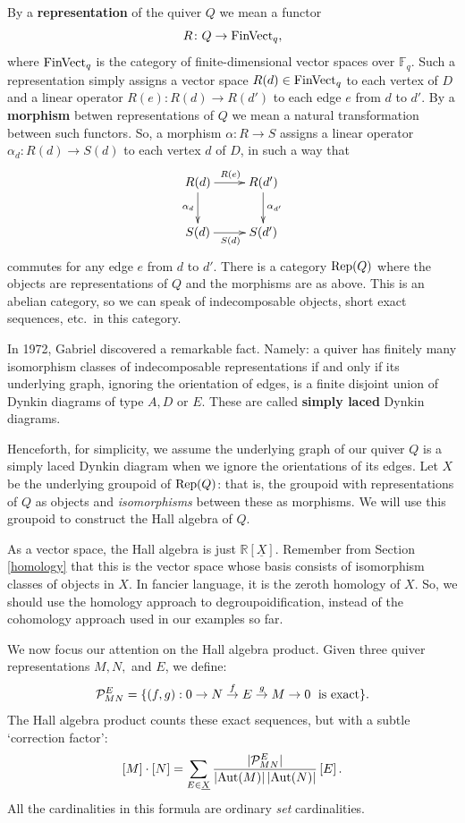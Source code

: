 \documentclass{article}
\newcommand{\Rep}{{\rm Rep}}
\newcommand{\FinVect}{{\rm FinVect}}
\renewcommand{\to}{\rightarrow}
\newcommand{\maps}{\colon}
\newcommand{\R}{{\mathbb R}}
\newcommand{\F}{{\mathbb F}}
\newcommand{\Aut}{{\rm Aut}}
\renewcommand{\u}[1]{\underline{#1}}
\begin{document}
By a \textbf{representation} of the quiver $Q$ we mean a functor 
\[   R \maps Q \to \FinVect_q, \]
where $\FinVect_q$ is the category of finite-dimensional vector spaces
over $\F_q$.  Such a representation simply assigns a vector space
$R(d) \in \FinVect_q$ to each vertex of $D$ and a linear operator
$R(e) \maps R(d) \to R(d')$ to each edge $e$ from $d$ to $d'$.  By a
\textbf{morphism} betwen representations of $Q$ we mean a natural
transformation between such functors.  So, a morphism $\alpha \maps R
\to S$ assigns a linear operator $\alpha_d \maps R(d) \to S(d)$ to
each vertex $d$ of $D$, in such a way that
\[
\xymatrix{
R(d) \ar[d]_{\alpha_d} \ar[r]^{R(e)} & R(d') \ar[d]^{\alpha_{d'}} \\
S(d) \ar[r]_{S(d)} & S(d')
}
\]
commutes for any edge $e$ from $d$ to $d'$.  There is a category
$\Rep(Q)$ where the objects are representations of $Q$ and the
morphisms are as above.  This is an abelian category, so we can speak
of indecomposable objects, short exact sequences, etc.\ in this
category.

In 1972, Gabriel \cite{Gabriel} discovered a remarkable fact.  Namely:
a quiver has finitely many isomorphism classes of indecomposable
representations if and only if its underlying graph, ignoring the
orientation of edges, is a finite disjoint union of Dynkin diagrams of
type $A, D$ or $E$.  These are called {\bf simply laced} Dynkin
diagrams.

Henceforth, for simplicity, we assume the underlying graph of our
quiver $Q$ is a simply laced Dynkin diagram when we ignore the
orientations of its edges.  Let $X$ be the underlying groupoid of
$\Rep(Q)$: that is, the groupoid with representations of $Q$ as
objects and \textit{isomorphisms} between these as morphisms.  We will
use this groupoid to construct the Hall algebra of $Q$.

As a vector space, the Hall algebra is just $\R[\u{X}]$.
Remember from Section \ref{homology} that this is the vector space
whose basis consists of isomorphism classes of objects in $X$.  In
fancier language, it is the zeroth homology of $X$.  So, we should use
the homology approach to degroupoidification, instead of the
cohomology approach used in our examples so far.

We now focus our attention on the Hall algebra product.  Given three quiver
representations $M,N,$ and $E$, we define:
\[\mathcal{P}_{MN}^E=
\{(f,g): 
0\to N \stackrel{f}{\rightarrow} E \stackrel{g}{\rightarrow} M \to 0 
\textrm{\; is exact} \}. \]
The Hall algebra product counts these exact sequences, but with a
subtle `correction factor':
\[[M] \cdot [N] =\sum_{E \in \u{X}} 
\frac{|\mathcal{P}_{MN}^E|}{|\Aut(M)| \, |\Aut(N)|}\, [E] \,.\]
All the cardinalities in this formula are ordinary \textit{set}
cardinalities.  
\end{document}
